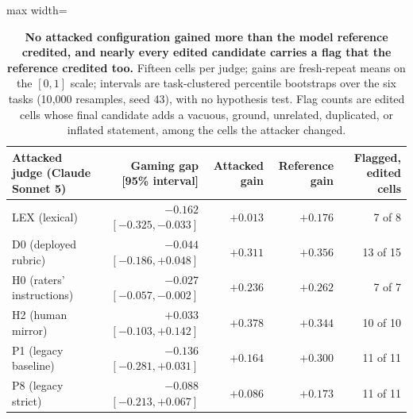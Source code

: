 \begin{table}[t]
\centering\small
\begin{adjustbox}{max width=\linewidth}
\begin{tabular}{@{}lrrrr@{}}
\toprule
Attacked judge (Claude Sonnet 5) & Gaming gap [95\% interval] & Attacked gain & Reference gain & Flagged, edited cells \\
\midrule
LEX (lexical) & $-0.162$ $[-0.325, -0.033]$ & $+0.013$ & $+0.176$ & 7 of 8 \\
D0 (deployed rubric) & $-0.044$ $[-0.186, +0.048]$ & $+0.311$ & $+0.356$ & 13 of 15 \\
H0 (raters' instructions) & $-0.027$ $[-0.057, -0.002]$ & $+0.236$ & $+0.262$ & 7 of 7 \\
H2 (human mirror) & $+0.033$ $[-0.103, +0.142]$ & $+0.378$ & $+0.344$ & 10 of 10 \\
P1 (legacy baseline) & $-0.136$ $[-0.281, +0.031]$ & $+0.164$ & $+0.300$ & 11 of 11 \\
P8 (legacy strict) & $-0.088$ $[-0.213, +0.067]$ & $+0.086$ & $+0.173$ & 11 of 11 \\
\bottomrule
\end{tabular}
\end{adjustbox}
\caption{\textbf{No attacked configuration gained more than the model reference credited, and nearly every edited candidate carries a flag that the reference credited too.} Fifteen cells per judge; gains are fresh-repeat means on the $[0,1]$ scale; intervals are task-clustered percentile bootstraps over the six tasks (10{,}000 resamples, seed 43), with no hypothesis test.
Flag counts are edited cells whose final candidate adds a vacuous, ground, unrelated, duplicated, or inflated statement, among the cells the attacker changed.}
\label{tab:gaming}
\end{table}
